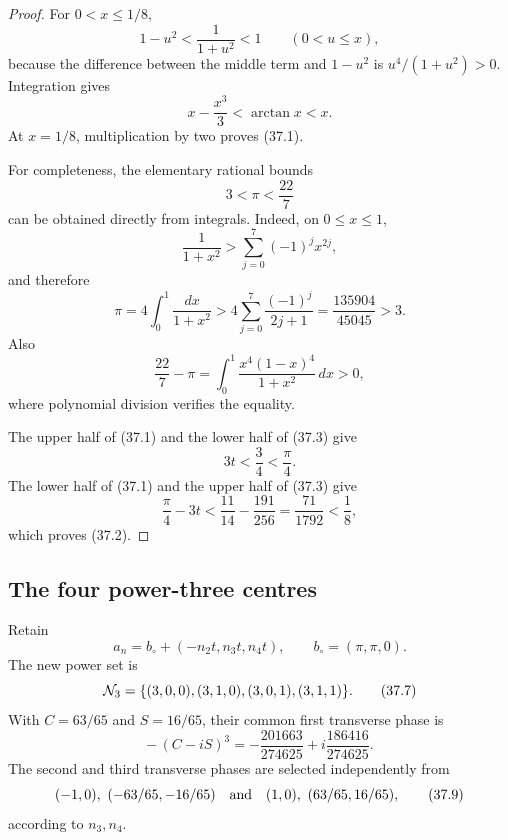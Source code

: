 \documentclass[11pt,oneside]{article}
\theoremstyle{definition}
\theoremstyle{remark}
\begin{document}
\begin{proof}
For \(0<x\le1/8\),
\[
 1-u^2<\frac1{1+u^2}<1\qquad(0<u\le x),
\]
because the difference between the middle term and \(1-u^2\) is
\(u^4/(1+u^2)>0\).  Integration gives
\[
 x-\frac{x^3}{3}<\arctan x<x.
\]
At \(x=1/8\), multiplication by two proves (37.1).

For completeness, the elementary rational bounds
\[
 3<\pi<\frac{22}{7}                                   \tag{37.3}
\]
can be obtained directly from integrals.  Indeed, on \(0\le x\le1\),
\[
 \frac1{1+x^2}>
 \sum_{j=0}^{7}(-1)^j x^{2j},
\]
and therefore
\[
 \pi=4\int_0^1\frac{dx}{1+x^2}
 >
 4\sum_{j=0}^{7}\frac{(-1)^j}{2j+1}
 =\frac{135904}{45045}>3.                             \tag{37.4}
\]
Also
\[
 \frac{22}{7}-\pi
 =\int_0^1\frac{x^4(1-x)^4}{1+x^2}\,dx>0,             \tag{37.5}
\]
where polynomial division verifies the equality.

The upper half of (37.1) and the lower half of (37.3) give
\[
 3t<\frac34<\frac{\pi}{4}.
\]
The lower half of (37.1) and the upper half of (37.3) give
\[
 \frac{\pi}{4}-3t
 <\frac{11}{14}-\frac{191}{256}
 =\frac{71}{1792}<\frac18,
\]
which proves (37.2).
\end{proof}

\subsection{The four power-three centres}

Retain
\[
 a_n=b_\circ+(-n_2t,n_3t,n_4t),
 \qquad b_\circ=(\pi,\pi,0).                           \tag{37.6}
\]
The new power set is
\[
 {\cal N}_3=\{(3,0,0),(3,1,0),(3,0,1),(3,1,1)\}.       \tag{37.7}
\]
With \(C=63/65\) and \(S=16/65\), their common first
transverse phase is
\[
 -\,(C-iS)^3
 =-\frac{201663}{274625}
   +i\frac{186416}{274625}.                            \tag{37.8}
\]
The second and third transverse phases are selected independently
from
\[
 (-1,0),\ (-63/65,-16/65)
 \quad\hbox{and}\quad
 (1,0),\ (63/65,16/65),                               \tag{37.9}
\]
according to \(n_3,n_4\).
\end{document}
